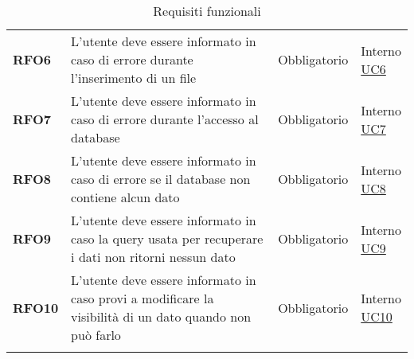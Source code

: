 \begin{longtable}[H]{>{\raggedright\bfseries}m{20mm} >{\raggedright}m{90mm} >{\raggedright}m{28mm} >{\raggedright\arraybackslash}m{30mm}}
    RFO6
    & L'utente deve essere informato in caso di errore durante l'inserimento di un file
    & Obbligatorio
    & \makecell{ Interno \\  \hyperref[sub:uc6]{UC6} }\\

    RFO7
    & L'utente deve essere informato in caso di errore durante l'accesso al database
    & Obbligatorio
    & \makecell{ Interno \\  \hyperref[sub:uc7]{UC7} }\\

    RFO8
    & L'utente deve essere informato in caso di errore se il database non contiene alcun dato
    & Obbligatorio
    & \makecell{ Interno \\  \hyperref[sub:uc8]{UC8} }\\

    RFO9
    & L'utente deve essere informato in caso la query usata per recuperare i dati non ritorni nessun dato
    & Obbligatorio
    & \makecell{ Interno \\  \hyperref[sub:uc9]{UC9} }\\

    RFO10
    & L'utente deve essere informato in caso provi a modificare la visibilità di un dato quando non può farlo
    & Obbligatorio
    & \makecell{ Interno \\  \hyperref[sub:uc10]{UC10} }\\
    \caption{Requisiti funzionali}%
    \label{tab:requisiti_funzionali} \\
\end{longtable}
